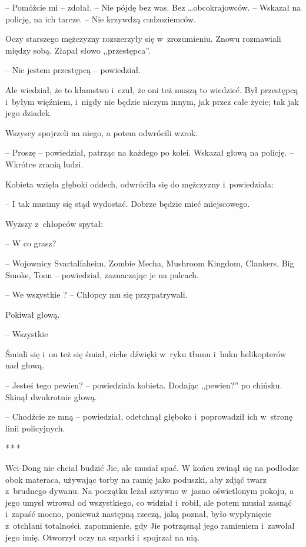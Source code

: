 \documentclass[oneside,polish,11pt,rmheadings]{mwbk}
\newcommand{\threeast}{\par\centerline{*\,*\,*}\medskip\par}
\begin{document}
-- Pomóżcie mi -- zdołał. -- Nie pójdę bez was. Bez \ldots  obcokrajowców. -- Wskazał na policję, na ich tarcze. -- Nie krzywdzą cudzoziemców.

Oczy starszego mężczyzny rozszerzyły się w~zrozumieniu. Znowu rozmawiali między sobą. Złapał słowo ,,przestępca''.

-- Nie jestem przestępcą -- powiedział. 

Ale wiedział, że to kłamstwo i~czuł, że oni też muszą to wiedzieć. Był przestępcą i~byłym więźniem, i~nigdy nie będzie niczym innym, jak przez całe życie; tak jak jego dziadek.

Wszyscy spojrzeli na niego, a potem odwrócili wzrok.

-- Proszę -- powiedział, patrząc na każdego po kolei. Wskazał głową na policję. -- Wkrótce zranią ludzi.

Kobieta wzięła głęboki oddech, odwróciła się do mężczyzny i~powiedziała: 

-- I tak musimy się stąd wydostać. Dobrze będzie mieć miejscowego.

Wyższy z~chłopców spytał: 

-- W co grasz?

-- Wojownicy Svartalfaheim, Zombie Mecha, Mushroom Kingdom, Clankers, Big Smoke, Toon -- powiedział, zaznaczając je na palcach.

-- We wszystkie ? -- Chłopcy mu się przypatrywali.

Pokiwał głową.

 -- Wszystkie 

Śmiali się i~on też się śmiał, ciche dźwięki w~ryku tłumu i~huku helikopterów nad głową.

-- Jesteś tego pewien? -- powiedziała kobieta. Dodając ,,pewien?'' po chińsku. Skinął dwukrotnie głową.

-- Chodźcie ze mną -- powiedział, odetchnął głęboko i~poprowadził ich w~stronę linii policyjnych.

\bigskip
\threeast

Wei-Dong nie chciał budzić Jie, ale musiał spać. W końcu zwinął się na podłodze obok materaca, używając torby na ramię jako poduszki, aby zdjąć twarz z~brudnego dywanu. Na początku leżał sztywno w~jasno oświetlonym pokoju, a jego umysł wirował od wszystkiego, co widział i~robił, ale potem musiał zasnąć i~zapaść mocno, ponieważ następną rzeczą, jaką poznał, było wypłynięcie z~otchłani totalności. zapomnienie, gdy Jie potrząsnął jego ramieniem i~zawołał jego imię. Otworzył oczy na szparki i~spojrzał na nią. 
\end{document}
